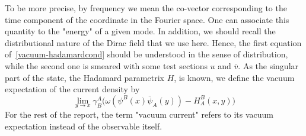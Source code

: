 To be more precise, 
by frequency we mean the co-vector corresponding to the time component of the coordinate in the Fourier space.
One can associate this quantity to the "energy" of a given mode. 
In addition, we should recall the distributional nature of the Dirac field that we use here. 
Hence, the first equation of~\cref{vacuum-hadamardcond} should be understood in the sense of distribution,
while the second one is smeared with some test sections $u$ and $\bar{v}$. 
As the singular part of the state, the Hadamard parametrix $H$, is known, we define the vacuum expectation of the current density by 
\begin{equation}\label{vacuum-currentexpression}
\lim_{y \rightarrow x} \gamma^A_B \big(
\omega(\psi^B(x)\bar{\psi}_A(y)) - H^B_A (x, y)\big)
\end{equation}
For the rest of the report, the term "vacuum current" refers to its vacuum expectation instead of the observable itself. 

%
